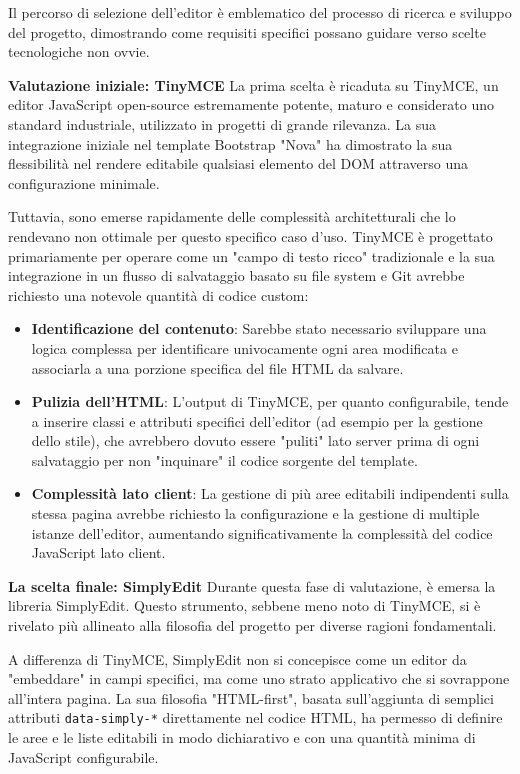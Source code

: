 Il percorso di selezione dell'editor è emblematico del processo di ricerca e sviluppo del progetto, dimostrando come requisiti specifici possano guidare verso scelte tecnologiche non ovvie.

\textbf{Valutazione iniziale: TinyMCE}
La prima scelta è ricaduta su TinyMCE, un editor JavaScript open-source estremamente potente, maturo e considerato uno standard industriale, utilizzato in progetti di grande rilevanza. La sua integrazione iniziale nel template Bootstrap "Nova" ha dimostrato la sua flessibilità nel rendere editabile qualsiasi elemento del DOM attraverso una configurazione minimale.

Tuttavia, sono emerse rapidamente delle complessità architetturali che lo rendevano non ottimale per questo specifico caso d'uso. TinyMCE è progettato primariamente per operare come un "campo di testo ricco" tradizionale e la sua integrazione in un flusso di salvataggio basato su file system e Git avrebbe richiesto una notevole quantità di codice custom:
\begin{itemize}
    \item \textbf{Identificazione del contenuto}: Sarebbe stato necessario sviluppare una logica complessa per identificare univocamente ogni area modificata e associarla a una porzione specifica del file HTML da salvare.
    \item \textbf{Pulizia dell'HTML}: L'output di TinyMCE, per quanto configurabile, tende a inserire classi e attributi specifici dell'editor (ad esempio per la gestione dello stile), che avrebbero dovuto essere "puliti" lato server prima di ogni salvataggio per non "inquinare" il codice sorgente del template.
    \item \textbf{Complessità lato client}: La gestione di più aree editabili indipendenti sulla stessa pagina avrebbe richiesto la configurazione e la gestione di multiple istanze dell'editor, aumentando significativamente la complessità del codice JavaScript lato client.
\end{itemize}

\textbf{La scelta finale: SimplyEdit}
Durante questa fase di valutazione, è emersa la libreria SimplyEdit. Questo strumento, sebbene meno noto di TinyMCE, si è rivelato più allineato alla filosofia del progetto per diverse ragioni fondamentali. 

A differenza di TinyMCE, SimplyEdit non si concepisce come un editor da "embeddare" in campi specifici, ma come uno strato applicativo che si sovrappone all'intera pagina. La sua filosofia "HTML-first", basata sull'aggiunta di semplici attributi \texttt{data-simply-*} direttamente nel codice HTML, ha permesso di definire le aree e le liste editabili in modo dichiarativo e con una quantità minima di JavaScript configurabile.

